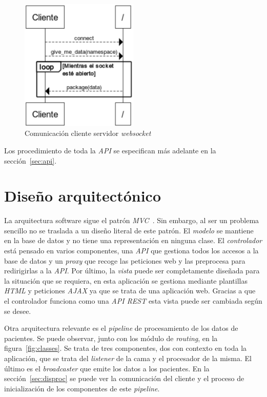 \begin{figure}
	\centering
	\includegraphics[width=0.5\textwidth]{img/ws-secuence.png}
	\caption{Comunicación cliente servidor \textit{websocket}}
	\label{fig:ws-secuence}
\end{figure}

Los procedimiento de toda la \textit{API} se especifican más adelante en la sección~\ref{sec:api}.

\section{Diseño arquitectónico}

La arquitectura software sigue el patrón \textit{MVC}~\cite{wiki:mvc}. Sin embargo, al ser un problema sencillo no se traslada a un diseño literal de este patrón. El \textit{modelo} se mantiene en la base de datos y no tiene una representación en ninguna clase. El \textit{controlador} está pensado en varios componentes, una \textit{API} que gestiona todos los accesos a la base de datos y un \textit{proxy} que recoge las peticiones web y las preprocesa para redirigirlas a la \textit{API}. Por último, la \textit{vista} puede ser completamente diseñada para la situación que se requiera, en esta aplicación se gestiona mediante plantillas \textit{HTML} y peticiones \textit{AJAX} ya que se trata de una aplicación web. Gracias a que el controlador funciona como una \textit{API REST} esta vista puede ser cambiada según se desee.

Otra arquitectura relevante es el \textit{pipeline} de procesamiento de los datos de pacientes. Se puede observar, junto con los módulo de \textit{routing}, en la figura~\ref{fig:classes}. Se trata de tres componentes, dos con contexto en toda la aplicación, que se trata del \textit{listener} de la cama y el procesador de la misma. El último es el \textit{broadcaster} que emite los datos a los pacientes. En la sección~\ref{sec:disproc} se puede ver la comunicación del cliente y el proceso de inicialización de los componentes de este \textit{pipeline}.

